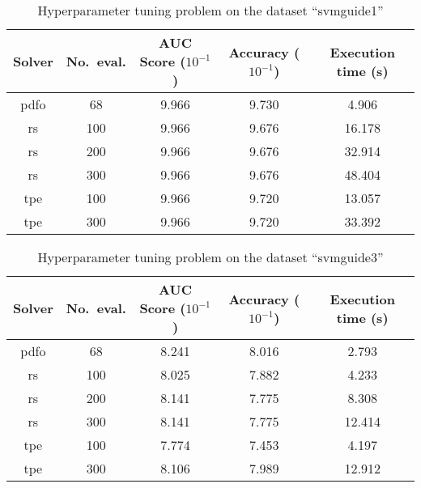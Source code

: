 \begin{table}[!ht]
    \caption{Hyperparameter tuning problem on the dataset \enquote{svmguide1}}
    \label{tab:svmguide1}
    \centering
    \begin{tabular}{cS[table-parse-only]SSS}
        \toprule
        Solver      & {No.\ eval.}  & {AUC Score ($10^{-1}$)}   & {Accuracy ($10^{-1}$)}    & {Execution time (\si{\second})}\\
        \midrule
        \gls{pdfo}  & 68            & 9.966                     & 9.730                     & 4.906\\
        \gls{rs}    & 100           & 9.966                     & 9.676                     & 16.178\\
        \gls{rs}    & 200           & 9.966                     & 9.676                     & 32.914\\
        \gls{rs}    & 300           & 9.966                     & 9.676                     & 48.404\\
        \gls{tpe}   & 100           & 9.966                     & 9.720                     & 13.057\\
        \gls{tpe}   & 300           & 9.966                     & 9.720                     & 33.392\\
        \bottomrule
    \end{tabular}
\end{table}

\begin{table}[!ht]
    \caption{Hyperparameter tuning problem on the dataset \enquote{svmguide3}}
    \label{tab:svmguide3}
    \centering
    \begin{tabular}{cS[table-parse-only]SSS}
        \toprule
        Solver      & {No.\ eval.}  & {AUC Score ($10^{-1}$)}   & {Accuracy ($10^{-1}$)}    & {Execution time (\si{\second})}\\
        \midrule
        \gls{pdfo}  & 68            & 8.241                     & 8.016                     & 2.793\\
        \gls{rs}    & 100           & 8.025                     & 7.882                     & 4.233\\
        \gls{rs}    & 200           & 8.141                     & 7.775                     & 8.308\\
        \gls{rs}    & 300           & 8.141                     & 7.775                     & 12.414\\
        \gls{tpe}   & 100           & 7.774                     & 7.453                     & 4.197\\
        \gls{tpe}   & 300           & 8.106                     & 7.989                     & 12.912\\
        \bottomrule
    \end{tabular}
\end{table}


